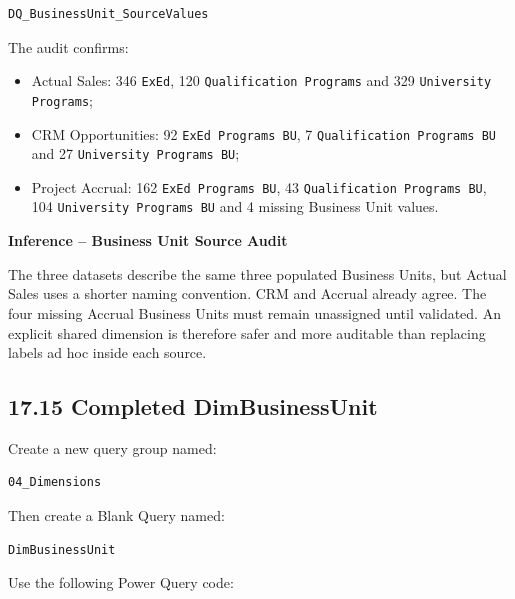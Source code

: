 \documentclass[11pt,a4paper]{article}
\begin{document}
\begin{lstlisting}[style=powerquery]
DQ_BusinessUnit_SourceValues
\end{lstlisting}

The audit confirms:

\begin{itemize}[leftmargin=7mm,itemsep=2pt]
    \item Actual Sales: 346 \texttt{ExEd}, 120 \texttt{Qualification Programs}
    and 329 \texttt{University Programs};
    \item CRM Opportunities: 92 \texttt{ExEd Programs BU},
    7 \texttt{Qualification Programs BU} and
    27 \texttt{University Programs BU};
    \item Project Accrual: 162 \texttt{ExEd Programs BU},
    43 \texttt{Qualification Programs BU},
    104 \texttt{University Programs BU} and 4 missing Business Unit values.
\end{itemize}

\begin{inferencebox}

\textbf{Inference -- Business Unit Source Audit}

The three datasets describe the same three populated Business Units, but Actual
Sales uses a shorter naming convention. CRM and Accrual already agree. The four
missing Accrual Business Units must remain unassigned until validated. An
explicit shared dimension is therefore safer and more auditable than replacing
labels ad hoc inside each source.

\end{inferencebox}

\subsection{17.15 Completed DimBusinessUnit}

Create a new query group named:

\begin{lstlisting}[style=powerquery]
04_Dimensions
\end{lstlisting}

Then create a Blank Query named:

\begin{lstlisting}[style=powerquery]
DimBusinessUnit
\end{lstlisting}

Use the following Power Query code:
\end{document}

